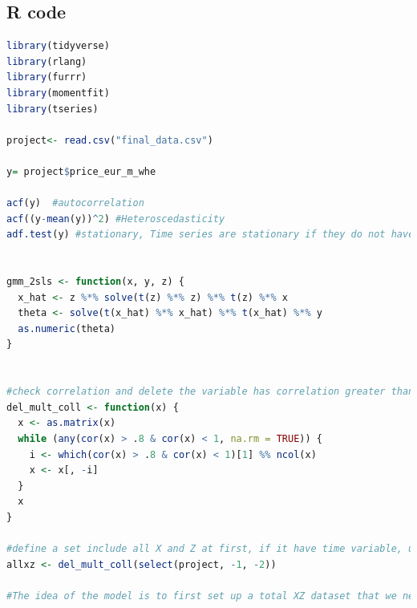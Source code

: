 \documentclass[12pt]{article}
\begin{document}
\subsection{R code}
\begin{lstlisting}[language=R]
library(tidyverse)
library(rlang)
library(furrr)
library(momentfit)
library(tseries)

project<- read.csv("final_data.csv")

y= project$price_eur_m_whe

acf(y)  #autocorrelation
acf((y-mean(y))^2) #Heteroscedasticity 
adf.test(y) #stationary, Time series are stationary if they do not have trend or seasonal effects


gmm_2sls <- function(x, y, z) {
  x_hat <- z %*% solve(t(z) %*% z) %*% t(z) %*% x
  theta <- solve(t(x_hat) %*% x_hat) %*% t(x_hat) %*% y
  as.numeric(theta)
}


#check correlation and delete the variable has correlation greater than 0.8 (if you want to change another correlation, change 0.8 in the loop with other correlation you want)
del_mult_coll <- function(x) {
  x <- as.matrix(x)
  while (any(cor(x) > .8 & cor(x) < 1, na.rm = TRUE)) {
    i <- which(cor(x) > .8 & cor(x) < 1)[1] %% ncol(x)
    x <- x[, -i]
  }
  x
}

#define a set include all X and Z at first, if it have time variable, use -1, -2, and use time in first column and y in second column, if there has no time variable, only use ,1 and make sure y is in first colum
allxz <- del_mult_coll(select(project, -1, -2))

#The idea of the model is to first set up a total XZ dataset that we need, then bring in loop, which will calculate and find all the results that satisfy both the coefficient p-value and hesen test, and then store them in the allmodel set


\end{lstlisting}
\end{document}
